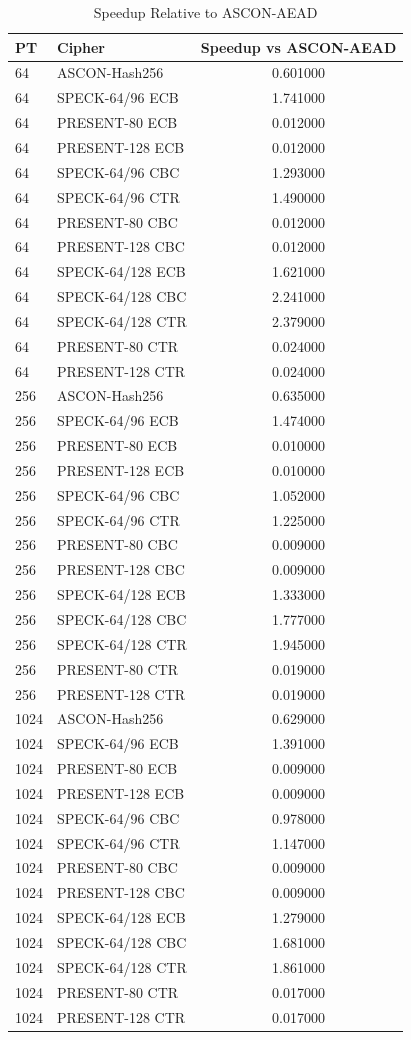 \begin{table}
\caption{Speedup Relative to ASCON-AEAD}
\label{tab:speedup}
\begin{tabular}{@{}llc@{}}
\toprule
PT & Cipher & Speedup vs ASCON-AEAD \\
\midrule
64 & ASCON-Hash256 & 0.601000 \\
64 & SPECK-64/96 ECB & 1.741000 \\
64 & PRESENT-80 ECB & 0.012000 \\
64 & PRESENT-128 ECB & 0.012000 \\
64 & SPECK-64/96 CBC & 1.293000 \\
64 & SPECK-64/96 CTR & 1.490000 \\
64 & PRESENT-80 CBC & 0.012000 \\
64 & PRESENT-128 CBC & 0.012000 \\
64 & SPECK-64/128 ECB & 1.621000 \\
64 & SPECK-64/128 CBC & 2.241000 \\
64 & SPECK-64/128 CTR & 2.379000 \\
64 & PRESENT-80 CTR & 0.024000 \\
64 & PRESENT-128 CTR & 0.024000 \\
256 & ASCON-Hash256 & 0.635000 \\
256 & SPECK-64/96 ECB & 1.474000 \\
256 & PRESENT-80 ECB & 0.010000 \\
256 & PRESENT-128 ECB & 0.010000 \\
256 & SPECK-64/96 CBC & 1.052000 \\
256 & SPECK-64/96 CTR & 1.225000 \\
256 & PRESENT-80 CBC & 0.009000 \\
256 & PRESENT-128 CBC & 0.009000 \\
256 & SPECK-64/128 ECB & 1.333000 \\
256 & SPECK-64/128 CBC & 1.777000 \\
256 & SPECK-64/128 CTR & 1.945000 \\
256 & PRESENT-80 CTR & 0.019000 \\
256 & PRESENT-128 CTR & 0.019000 \\
1024 & ASCON-Hash256 & 0.629000 \\
1024 & SPECK-64/96 ECB & 1.391000 \\
1024 & PRESENT-80 ECB & 0.009000 \\
1024 & PRESENT-128 ECB & 0.009000 \\
1024 & SPECK-64/96 CBC & 0.978000 \\
1024 & SPECK-64/96 CTR & 1.147000 \\
1024 & PRESENT-80 CBC & 0.009000 \\
1024 & PRESENT-128 CBC & 0.009000 \\
1024 & SPECK-64/128 ECB & 1.279000 \\
1024 & SPECK-64/128 CBC & 1.681000 \\
1024 & SPECK-64/128 CTR & 1.861000 \\
1024 & PRESENT-80 CTR & 0.017000 \\
1024 & PRESENT-128 CTR & 0.017000 \\
\bottomrule
\end{tabular}
\end{table}
